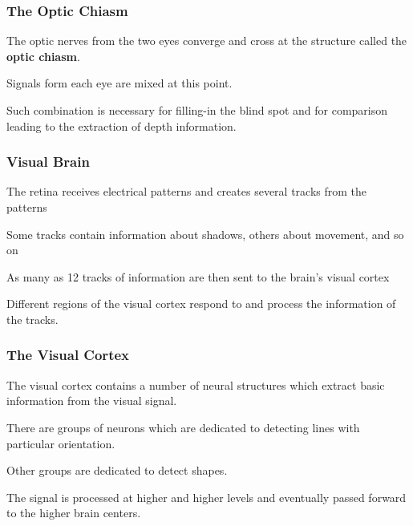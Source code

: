 \documentclass[12pt]{beamer}\usepackage[]{graphicx}\usepackage[]{color}
\begin{document}

\begin{frame}
\frametitle{The Optic Chiasm}

\bbi
  \item The optic nerves from the two eyes converge and cross at the structure
  called the \textbf{optic chiasm}.
  \item Signals form each eye are mixed at this point.
  \item Such combination is necessary for filling-in the blind spot and for
  comparison leading to the extraction of depth information.
\ei

\end{frame}


\begin{frame}
\frametitle{Visual Brain}

\bbi
  \item The retina receives electrical patterns and creates several tracks 
  from the patterns
  \item Some tracks contain information about shadows, others about movement,
  and so on
  \item As many as 12 tracks of information are then sent to the brain's
  visual cortex
  \item Different regions of the visual cortex respond to and process the
  information of the tracks.
\ei

\end{frame}


\begin{frame}
\frametitle{The Visual Cortex}

\bbi
  \item The visual cortex contains a number of neural structures which extract
  basic information from the visual signal.
  \item There are groups of neurons which are dedicated to detecting lines
  with particular orientation.
  \item Other groups are dedicated to detect shapes.
  \item The signal is processed at higher and higher levels and eventually
  passed forward to the higher brain centers.
\ei

\end{frame}
\end{document}
